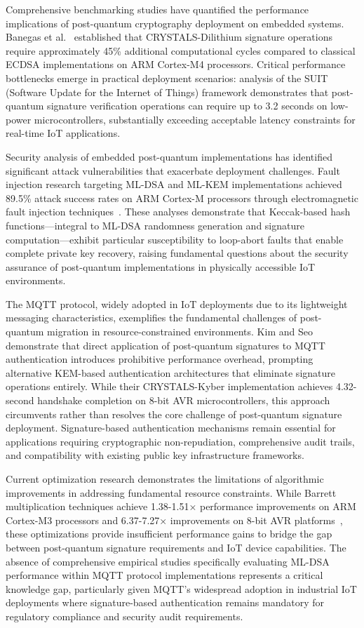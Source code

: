 \documentclass[journal=tches,final]{iacrtrans}
\begin{document}
Comprehensive benchmarking studies have quantified the performance implications of post-quantum cryptography deployment on embedded systems. Banegas et al.~\cite{Banegas2021} established that CRYSTALS-Dilithium signature operations require approximately 45\% additional computational cycles compared to classical ECDSA implementations on ARM Cortex-M4 processors. Critical performance bottlenecks emerge in practical deployment scenarios: analysis of the SUIT (Software Update for the Internet of Things) framework demonstrates that post-quantum signature verification operations can require up to 3.2 seconds on low-power microcontrollers, substantially exceeding acceptable latency constraints for real-time IoT applications.

Security analysis of embedded post-quantum implementations has identified significant attack vulnerabilities that exacerbate deployment challenges. Fault injection research targeting ML-DSA and ML-KEM implementations achieved 89.5\% attack success rates on ARM Cortex-M processors through electromagnetic fault injection techniques~\cite{Li2024}. These analyses demonstrate that Keccak-based hash functions—integral to ML-DSA randomness generation and signature computation—exhibit particular susceptibility to loop-abort faults that enable complete private key recovery, raising fundamental questions about the security assurance of post-quantum implementations in physically accessible IoT environments.

The MQTT protocol, widely adopted in IoT deployments due to its lightweight messaging characteristics, exemplifies the fundamental challenges of post-quantum migration in resource-constrained environments. Kim and Seo~\cite{Kim2025} demonstrate that direct application of post-quantum signatures to MQTT authentication introduces prohibitive performance overhead, prompting alternative KEM-based authentication architectures that eliminate signature operations entirely. While their CRYSTALS-Kyber implementation achieves 4.32-second handshake completion on 8-bit AVR microcontrollers, this approach circumvents rather than resolves the core challenge of post-quantum signature deployment. Signature-based authentication mechanisms remain essential for applications requiring cryptographic non-repudiation, comprehensive audit trails, and compatibility with existing public key infrastructure frameworks.

Current optimization research demonstrates the limitations of algorithmic improvements in addressing fundamental resource constraints. While Barrett multiplication techniques achieve 1.38-1.51× performance improvements on ARM Cortex-M3 processors and 6.37-7.27× improvements on 8-bit AVR platforms~\cite{Barrett2023}, these optimizations provide insufficient performance gains to bridge the gap between post-quantum signature requirements and IoT device capabilities. The absence of comprehensive empirical studies specifically evaluating ML-DSA performance within MQTT protocol implementations represents a critical knowledge gap, particularly given MQTT's widespread adoption in industrial IoT deployments where signature-based authentication remains mandatory for regulatory compliance and security audit requirements.
\end{document}
